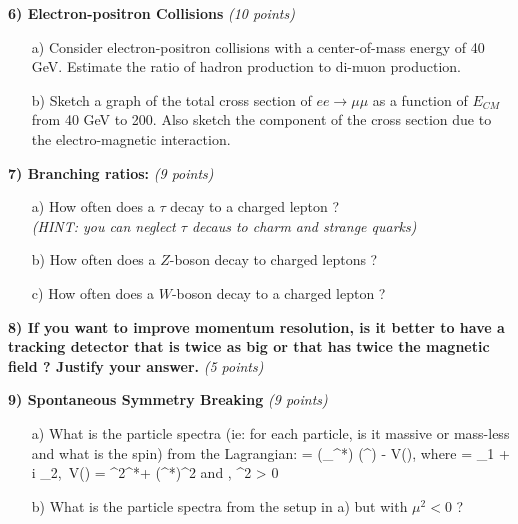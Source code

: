 {\textbf{6) Electron-positron Collisions } \hfill \textit{(10 points)}\\
\begin{itemize}
\item[a)]{Consider electron-positron collisions with a center-of-mass  energy of 40 GeV.
Estimate the ratio of hadron production to di-muon production. 
\vspace*{0.5in}
}
\item[b)]{Sketch a graph of the total cross section of $ee\rightarrow\mu\mu$ as a function of $E_{CM}$ from 40 GeV to 200. 
Also sketch the component of the cross section due to the electro-magnetic interaction.
\vspace*{0.5in}
}
\end{itemize}

\clearpage

\textbf{7) Branching ratios:  } \hfill \textit{(9 points)}\\
\begin{itemize}
\item[a)]{How often does a $\tau$ decay to a charged lepton ? \\ \textit{(HINT: you can neglect $\tau$ decaus to charm and strange quarks) }  
\vspace*{0.5in}
}
\item[b)]{How often does a $Z$-boson decay to charged leptons ?
\vspace*{0.5in}
}
\item[c)]{How often does a $W$-boson decay to a charged lepton ?
\vspace*{0.5in}
}
\end{itemize}


\textbf{8) If you want to improve momentum resolution, is it better to have a tracking detector that is twice as big or that has twice the magnetic field ?  Justify your answer.} \hfill \textit{(5 points)}\\
\vspace*{0.5in}


\textbf{9) Spontaneous Symmetry Breaking  } \hfill \textit{(9 points)}\\
\begin{itemize}
\item[a)]{ What is the particle spectra (ie: for each particle, is it massive or mass-less and what is the spin) from the Lagrangian: \be{} = (\partial_\mu \phi^*) (\partial^\mu \phi) - V(\phi), \textrm{ where } \phi = \phi_1 + i \phi_2,\  V(\phi) = \mu^2\phi^*\phi + \lambda (\phi^*\phi)^2\textrm { and } \lambda, \mu^2 > 0   \ee
\vspace{0.5in}
}
\item[b)]{ What is the particle spectra from the setup in a) but with $\mu^2 < 0$ ?
\vspace{0.5in}
}
\end{itemize}


}
